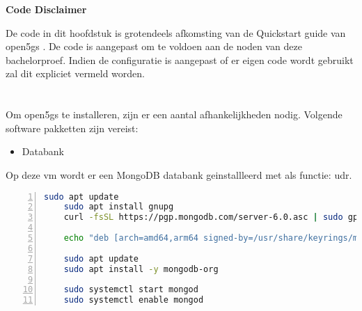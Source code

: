 \begin{center}
    \large\textbf{Code Disclaimer}
\end{center}

\vspace{0.5cm}

\noindent De code in dit hoofdstuk is grotendeels afkomsting van de Quickstart guide van \gls{open5gs} \autocite{Lee2025a}. De code is aangepast om te voldoen aan de noden van deze bachelorproef. Indien de configuratie is aangepast of er eigen code wordt gebruikt zal dit expliciet vermeld worden.
\vspace{0.3cm}

\section{}

Om \gls{open5gs} te installeren, zijn er een aantal afhankelijkheden nodig. Volgende software pakketten zijn vereist:

\begin{itemize}
    \item Databank
\end{itemize}

Op deze \gls{vm} wordt er een MongoDB databank geinstallleerd met als functie: \gls{udr}.





\begin{lstlisting}[basicstyle=\small, frame=single, breaklines=true, postbreak=\mbox{\textcolor{red}{$\hookrightarrow$}\space}, escapeinside ={\%,}, escapechar={!}, numbers=left, language=sh, caption=Installatie van MongoDB]
    sudo apt update
    sudo apt install gnupg
    curl -fsSL https://pgp.mongodb.com/server-6.0.asc | sudo gpg -o /usr/share/keyrings/mongodb-server-6.0.gpg --dearmor

    echo "deb [arch=amd64,arm64 signed-by=/usr/share/keyrings/mongodb-server-6.0.gpg] https://repo.mongodb.org/apt/ubuntu jammy/mongodb-org/6.0 multiverse" | sudo tee /etc/apt/sources.list.d/mongodb-org-6.0.list

    sudo apt update
    sudo apt install -y mongodb-org

    sudo systemctl start mongod 
    sudo systemctl enable mongod
\end{lstlisting}

